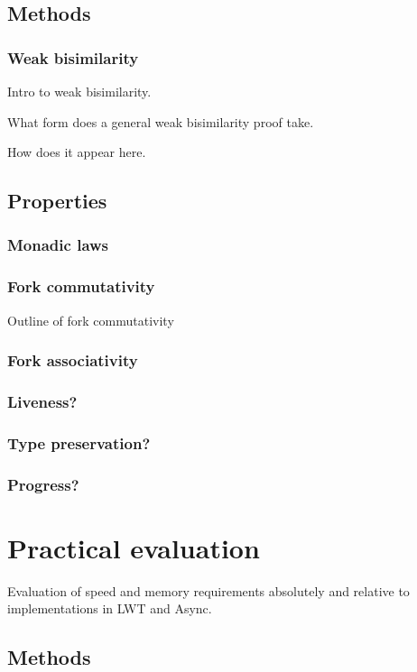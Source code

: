 \documentclass[12pt,twoside,notitlepage]{report}
\begin{document}
\subsection{Methods}
\subsubsection{Weak bisimilarity}
Intro to weak bisimilarity.


What form does a general weak bisimilarity proof take.


How does it appear here.
\subsection{Properties}
\subsubsection{Monadic laws}
\subsubsection{Fork commutativity}
Outline of fork commutativity
\subsubsection{Fork associativity}
\subsubsection{Liveness?}
\subsubsection{Type preservation?}
\subsubsection{Progress?} 

\section{Practical evaluation}
Evaluation of speed and memory requirements absolutely and relative to implementations in LWT and Async.
\subsection{Methods}
\end{document}
